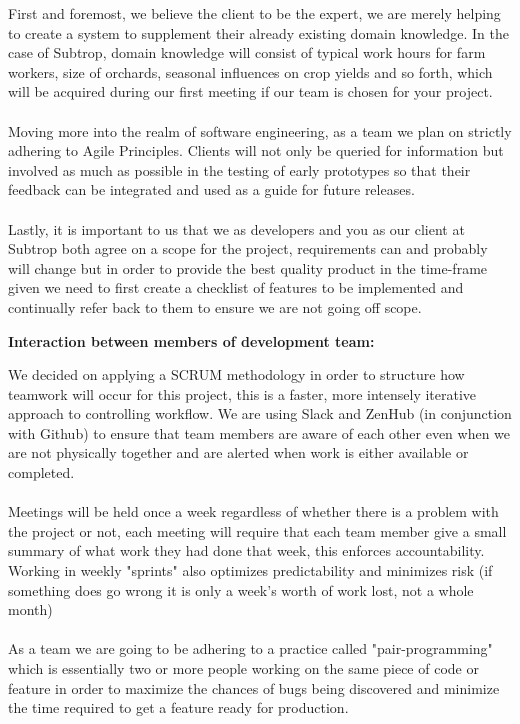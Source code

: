 \documentclass[11pt,pressrelease]{newlfm} %
\begin{document}
\begin{newlfm}
\begin{singlespace}
\textnormal First and foremost, we believe the client to be the expert, we are merely helping to create
			a system to supplement their already existing domain knowledge. In the case of Subtrop, domain knowledge will consist of typical work hours for farm workers, size of orchards, seasonal influences on crop yields and so forth, which will be acquired during our first meeting if our team is chosen for your project.
			\\ \\
			Moving more into the realm of software engineering, as a team we plan on strictly adhering 
			to Agile Principles. Clients will not only be queried for information but involved as much
			as possible in the testing of early prototypes so that their feedback can be integrated and 
			used as a guide for future releases.
			\\ \\
			Lastly, it is important to us that we as developers and you as our client at Subtrop both 
			agree on a scope for the project, requirements can and probably will change but in order
			to provide the best quality product in the time-frame given we need to first create a checklist of features to be implemented and continually refer back to them to ensure we are not going off scope.
				

\large \textbf{Interaction between members of development team:}

\textnormal We decided on applying a SCRUM methodology in order to structure how teamwork will occur for
			this project, this is a faster, more intensely iterative approach to controlling workflow.
			We are using Slack and ZenHub (in conjunction with Github) to ensure that team members are aware of each other even when we are not physically together and are alerted when work is either available or completed.
			\\ \\
			Meetings will be held once a week regardless of whether there is a problem with
			the project or not, each meeting will require that each team member give a small summary
			of what work they had done that week, this enforces accountability. Working in weekly "sprints" also optimizes predictability and minimizes risk (if something does go wrong it is only a week's worth of work lost, not a whole month)
			\\ \\
			As a team we are going to be adhering to a practice called "pair-programming" which is essentially two or more people working on the same piece of code or feature in order to maximize the chances of bugs being discovered and minimize the time required to get a feature ready for production. 
			\\ \\ 
\end{singlespace} %


\end{newlfm}
\end{document}
